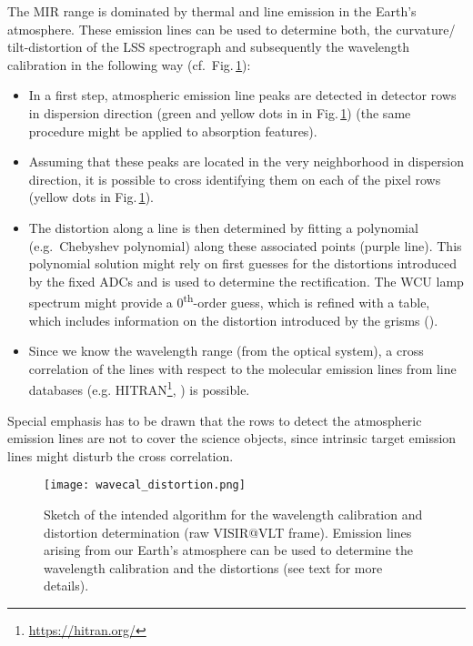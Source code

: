 The MIR range is dominated by thermal and line emission in the Earth's
atmosphere. These emission lines can be used to determine both, the
curvature/ tilt-distortion of the LSS spectrograph and subsequently
the wavelength calibration
in the following way (cf.\ Fig.\,\ref{fig:lm_lss_dist_wave}):\\
\begin{itemize}
\item In a first step, atmospheric emission line peaks are detected in
  detector rows in dispersion direction (green and yellow dots in in
  Fig.\,\ref{fig:lm_lss_dist_wave}) (the same procedure might be
  applied to absorption features).
\item Assuming that these peaks are located in the very neighborhood
  in dispersion direction, it is possible to cross identifying them on
  each of the pixel rows (yellow dots in
  Fig.\,\ref{fig:lm_lss_dist_wave}).
\item The distortion along a line is then determined by fitting a
  polynomial (e.g.\ Chebyshev polynomial) along these associated
  points (purple line).  This polynomial solution might rely on first
  guesses for the distortions introduced by the fixed ADCs and is used
  to determine the rectification. The WCU lamp spectrum might provide
  a 0\textsuperscript{th}-order guess, which is refined with a table,
  which includes information on the distortion introduced by the
  grisms ().
\item Since we know the wavelength range (from the optical system), a
  cross correlation of the lines with respect to the molecular
  emission lines from line databases
  (e.g. HITRAN\footnote{\url{https://hitran.org/}},
  \hyperref[dataitem:atm_line_cat]{}) is possible.
\end{itemize}
Special emphasis has to be drawn that the rows to detect the
atmospheric emission lines are not
to cover the science objects, since intrinsic target emission lines
might disturb the cross correlation.\\

\begin{figure}[ht]
  \centering
  \texttt{[image: wavecal\_distortion.png]}
  \caption[Algorithm for wavelength calibration and distortion
  determination]{%
    Sketch of the intended algorithm for the wavelength calibration
    and distortion determination (raw VISIR@VLT frame). Emission lines
    arising from our Earth's atmosphere can be used to determine the
    wavelength calibration and the distortions (see text for more
    details).}
  \label{fig:lm_lss_dist_wave}
\end{figure}

